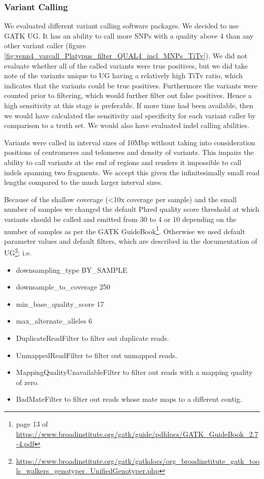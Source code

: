 \subsubsection{Variant Calling}
We evaluated different variant calling software packages. We decided to use \gls{GATK} \gls{UG}. It has an ability to call more \glspl{SNP} with a quality above 4 than any other variant caller (figure \ref{fig:venn4_varcall_Platypus_filter_QUAL4_incl_MNPs_TiTv}). We did not evaluate whether all of the called variants were true positives, but we did take note of the variants unique to \gls{UG} having a relatively high \gls{TiTv} ratio, which indicates that the variants could be true positives. Furthermore the variants were counted prior to filtering, which would further filter out false positives. Hence a high sensitivity at this stage is preferable. If more time had been available, then we would have calculated the sensitivity and specificity for each variant caller by comparison to a truth set. We would also have evaluated indel calling abilities.



Variants were called in interval sizes of 10\gls{Mbp} without taking into consideration positions of centromeres and telomeres and density of variants. This impairs the ability to call variants at the end of regions and renders it impossible to call indels spanning two fragments. We accept this given the infinitesimally small read lengths compared to the much larger interval sizes.

Because of the shallow coverage (\textless 10x coverage per sample) and the small
number of samples we changed the default Phred quality score threshold at which variants should be called and emitted from 30 to 4 or 10 depending on the number of samples as per the \gls{GATK} GuideBook\footnote{page 13 of \url{https://www.broadinstitute.org/gatk/guide/pdfdocs/GATK_GuideBook_2.7-4.pdf}}. Otherwise we used default parameter values and default filters, which are described in the documentation of \gls{UG}\footnote{\url{https://www.broadinstitute.org/gatk/gatkdocs/org_broadinstitute_gatk_tools_walkers_genotyper_UnifiedGenotyper.php}}; i.e.
\begin{itemize}
\item \-\-downsampling\_type BY\_SAMPLE
\item \-\-downsample\_to\_coverage 250
\item \-\-min\_base\_quality\_score 17
\item \-\-max\_alternate\_alleles 6
\item DuplicateReadFilter to filter out duplicate reads.
\item UnmappedReadFilter to filter out unmapped reads.
\item MappingQualityUnavailableFilter to filter out reads with a mapping quality of zero.
\item BadMateFilter to filter out reads whose mate maps to a different contig.
\end{itemize}

